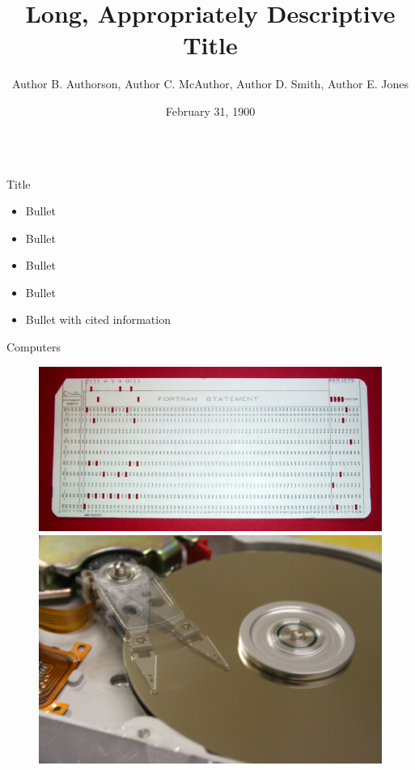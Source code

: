 \documentclass[final]{beamer}
\title[Short Title]{Long, Appropriately Descriptive Title}
\author[A.B. Authorson et al.]{Author B. Authorson, Author C. McAuthor, Author D. Smith, Author E. Jones}
\institute[UC Berkeley]{Department of Nuclear Engineering, University of California, Berkeley}
\date{February 31, 1900}
\begin{document}
	\begin{frame}{}


  		\begin{columns}[t]
    		\begin{column}{.3\linewidth}
    			\vfill
    			\begin{block}{\large Title}
      			\begin{itemize}
			\item{Bullet}
			\item{Bullet}
			\item{Bullet}
			\item{Bullet}
			\item{Bullet with cited information \cite{wiki:comp}}
			\end{itemize}
    			\end{block}
    	\vfill
    			\begin{block}{\large Computers}
			\begin{figure}[h!]
			\centering
	      		\includegraphics[width=10in]{FortranCardPROJ039.jpg}
			\newline
			\includegraphics[width=10in]{HDDspin.JPG}

\end{figure}
\end{block}
\end{column}
\end{columns}
\end{frame}
\end{document}
